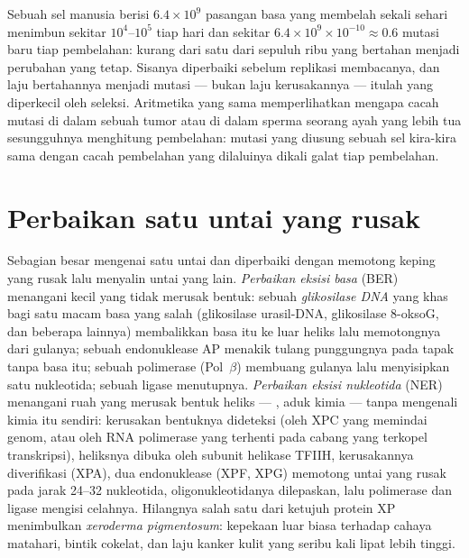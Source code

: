 \begin{example}\label{ex:b3:dna-repair:numbers}
Sebuah sel manusia berisi $6.4\times 10^{9}$ pasangan basa yang membelah
sekali sehari menimbun sekitar $10^{4}$--$10^{5}$  tiap hari dan
sekitar $6.4\times 10^{9}\times 10^{-10} \approx 0.6$ mutasi baru tiap
pembelahan: kurang dari satu  dari sepuluh ribu yang bertahan menjadi
perubahan yang tetap. Sisanya diperbaiki sebelum replikasi membacanya, dan
laju bertahannya  menjadi mutasi --- bukan laju kerusakannya --- itulah
yang diperkecil oleh seleksi. Aritmetika yang sama memperlihatkan mengapa
cacah mutasi di dalam sebuah tumor atau di dalam sperma seorang ayah yang
lebih tua sesungguhnya menghitung pembelahan: mutasi yang diusung sebuah sel
kira-kira sama dengan cacah pembelahan yang dilaluinya dikali galat tiap
pembelahan.
\end{example}

\section{Perbaikan satu untai yang rusak}

\begin{definition}\label{def:b3:dna-repair:excision}
%
Sebagian besar  mengenai satu untai dan diperbaiki dengan memotong
keping yang rusak lalu menyalin untai yang lain. \emph{Perbaikan eksisi basa}
(BER) menangani  kecil yang tidak merusak bentuk: sebuah \emph{glikosilase
DNA} yang khas bagi satu macam basa yang salah (glikosilase urasil-DNA,
glikosilase 8-oksoG, dan beberapa lainnya) membalikkan basa itu ke luar
heliks lalu memotongnya dari gulanya; sebuah endonuklease AP menakik tulang
punggungnya pada tapak tanpa basa itu; sebuah polimerase (Pol~$\beta$)
membuang gulanya lalu menyisipkan satu nukleotida; sebuah ligase menutupnya.
\emph{Perbaikan eksisi nukleotida} (NER) menangani  ruah yang merusak
bentuk heliks --- , aduk kimia --- tanpa mengenali kimia 
itu sendiri: kerusakan bentuknya dideteksi (oleh XPC yang memindai genom, atau
oleh RNA polimerase yang terhenti pada cabang yang terkopel transkripsi),
heliksnya dibuka oleh subunit helikase TFIIH, kerusakannya diverifikasi (XPA),
dua endonuklease (XPF, XPG) memotong untai yang rusak pada jarak
\numrange{24}{32} nukleotida, oligonukleotidanya dilepaskan, lalu polimerase
dan ligase mengisi celahnya. Hilangnya salah satu dari ketujuh protein XP
menimbulkan \emph{xeroderma pigmentosum}: kepekaan luar biasa terhadap cahaya
matahari, bintik cokelat, dan laju kanker kulit yang seribu kali lipat lebih
tinggi.
\end{definition}

